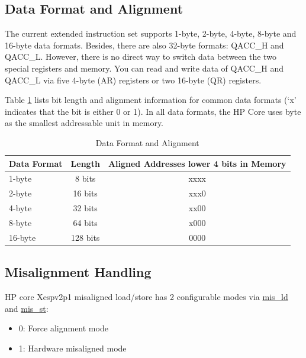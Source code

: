 \documentclass[main\_\_EN.tex]{subfiles}
\begin{document}
\subsection{Data Format and Alignment}
\label{sec:pie-data-align}

The current extended instruction set supports 1-byte, 2-byte, 4-byte, 8-byte and 16-byte data formats. Besides, there are also 32-byte formats: QACC\_H and QACC\_L. However, there is no direct way to switch data between the two special registers and memory. You can read and write data of QACC\_H and QACC\_L via five 4-byte (AR) registers or two 16-byte (QR) registers.

Table \ref{tab:pie_data_format_align} lists bit length and alignment information for common data formats (`x' indicates that the bit is either 0 or 1). In all data formats, the HP Core uses byte as the smallest addressable unit in memory.

\begin{table}[H]
\centering
\caption{Data Format and Alignment}
\label{tab:pie_data_format_align}
\begin{tabular}{|l|c|c|}
\hline
    \rowcolor{lightgray}
    \textbf{Data Format}  & \textbf{Length} & \textbf{Aligned Addresses lower 4 bits in Memory} \\\hline

    1-byte & 8 bits & xxxx \\\hline
    2-byte & 16 bits & xxx0 \\\hline
    4-byte & 32 bits & xx00 \\\hline
    8-byte & 64 bits & x000 \\\hline
    16-byte & 128 bits & 0000 \\\hline
    \end{tabular}
\end{table}

\subsection{Misalignment Handling}

\chipname{} HP core Xespv2p1 misaligned load/store has 2 configurable modes via \hyperref[mis_ld]{mis\_ld} and \hyperref[mis_st]{mis\_st}:
\begin{itemize}
    \item 0: Force alignment mode
    \item 1: Hardware misaligned mode
\end{itemize}
\end{document}
